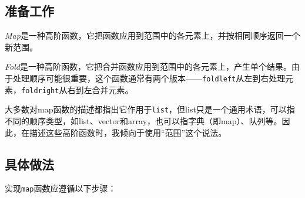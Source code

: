 
\subsection{准备工作}



\textit{Map}是一种高阶函数，它把函数应用到范围中的各元素上，并按相同顺序返回一个新范围。



\textit{Fold}是一种高阶函数，它把合并函数应用到范围中的各元素上，产生单个结果。由于处理顺序可能很重要，这个函数通常有两个版本——\texttt{foldleft}从左到右处理元素，\texttt{foldright}从右到左合并元素。



\begin{myNote}
大多数对map函数的描述都指出它作用于\texttt{list}，但list只是一个通用术语，可以指不同的顺序类型，如list、vector和array，也可以指字典（即map）、队列等。因此，在描述这些高阶函数时，我倾向于使用“范围”这个说法。
\end{myNote}



\subsection{具体做法}



实现\texttt{map}函数应遵循以下步骤：




